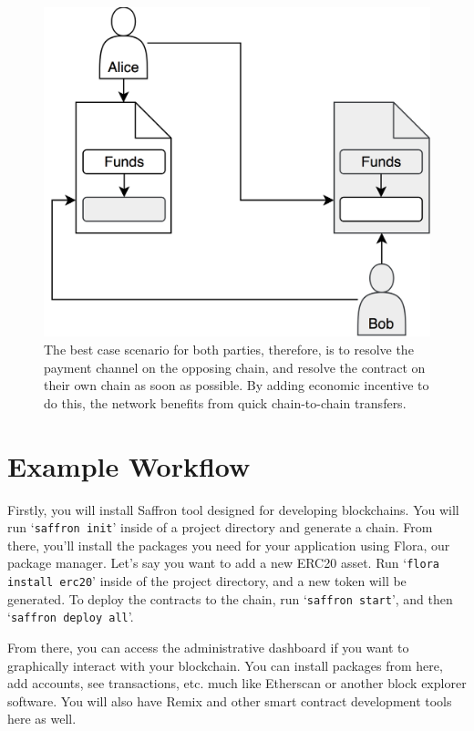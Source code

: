 \documentclass{%
	article}
\begin{document}
\begin{figure}[H]
\centering
\includegraphics[scale=0.112]{fig6.png}
\caption{\small\textnormal{The best case scenario for both parties, therefore, is to resolve the payment channel on the opposing chain, and resolve the contract on their own chain as soon as possible. By adding economic incentive to do this, the network benefits from quick chain-to-chain transfers.}}
\end{figure}

\section{Example Workflow}
Firstly, you will install Saffron tool designed for developing blockchains. You will run ‘\texttt{saffron init}' inside of a project directory and generate a chain. From there, you'll install the packages you need for your application using Flora, our package manager. Let's say you want to add a new ERC20 asset. Run ‘\texttt{flora install erc20}' inside of the project directory, and a new token will be generated. To deploy the contracts to the chain, run ‘\texttt{saffron start}', and then ‘\texttt{saffron deploy all}'.

From there, you can access the administrative dashboard if you want to graphically interact with your blockchain. You can install packages from here, add accounts, see transactions, etc. much like Etherscan or another block explorer software. You will also have Remix and other smart contract development tools here as well.
\end{document}

